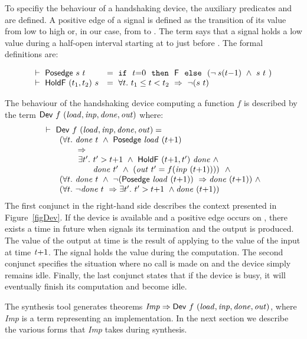 To specifiy the behaviour of a handshaking device,
the auxiliary predicates  and  are defined.
A positive edge of a signal is defined as the transition of its
value from low to high or, in our case, from  to . 
The term  says that a
signal  holds a low value  during a half-open interval
starting at  to just before . The formal definitions are:

\vspace*{-1mm}

\[
\begin{array}{ll}
\vdash\ \mathsf{Posedge}\ s\ t~ &      = ~ \texttt{if}~~t{=}0~~\texttt{then}~~\mathsf{F}~~\texttt{else}~~(\neg\hspace*{0.8mm} s(t{-}1)\ \wedge\ s\ t~)\\
\vdash\ \mathsf{HoldF}\ (t_1,t_2)\ s & = ~ \forall t.\ t_1 \leq t < t_2\ \Rightarrow\ \neg(s\ t)
\end{array}
\]



The behaviour of the handshaking device computing a function $f$ is described by the term 
$\DEF{Dev}\ f\ \VAR{(load,inp,done,out)}$ where:
\[
\begin{array}{l}
\TURNST\ \DEF{Dev}\ f\ \VAR{(load,inp,done,out)} = \\
~~\quad     (\forall t.\ \VAR{done}\ t\ \AND\ \DEF{Posedge}\ \VAR{load}\ (t{+}1)\ \\
\phantom{~~\quad     (\forall t.~} \IMP \\
\phantom{~~\quad     (\forall t.\ ~ } \exists t'.\ t' > t{+}1\ \AND\ \DEF{HoldF}\ (t{+}1,t')\ \VAR{done}\ \AND \\
\phantom{~~\quad     (\forall t.\ ~ \exists t'.\ }  \VAR{done}\ t'\ \AND\ (\VAR{out}\ t' = f (\VAR{inp}\ (t{+}1))))\ ~  \AND \\
~~\quad (\forall t.\ \VAR{done}\ t\ \AND\ \NOT(\DEF{Posedge}\ \VAR{load}\ (t{+}1))\ \IMP  \VAR{done}\ (t{+}1)) ~\AND \\
~~\quad (\forall t.\ \NOT\VAR{done}\ t\ \IMP \exists t'.\ t' > t{+}1\ \AND \VAR{done}\ (t{+}1))\\
\end{array}
\]
The first conjunct in the right-hand side describes the context presented
in Figure~\ref{figDev}. If the device is available and a positive
edge occurs on , there exists a time  in future
when  signals its termination and the output is produced.
The value of the output at time  is the result
of applying  to the value of the input at time $\mathit{t}{+}1$.
The signal  holds the value  during the computation.
The second conjunct specifies the situation where no call
is made on  and the device simply remains idle.
Finally, the last conjunct states that if the device
is busy, it will eventually finish its computation
and become idle.

The synthesis tool generates theorems ${\it{Imp}}
\Rightarrow \mathsf{Dev}\ f\ \mathit{(load,inp,done,out)}$, where {\it{Imp}}
is a term representing an implementation. In the next section we
describe the various forms that {\it{Imp}} takes during synthesis.
